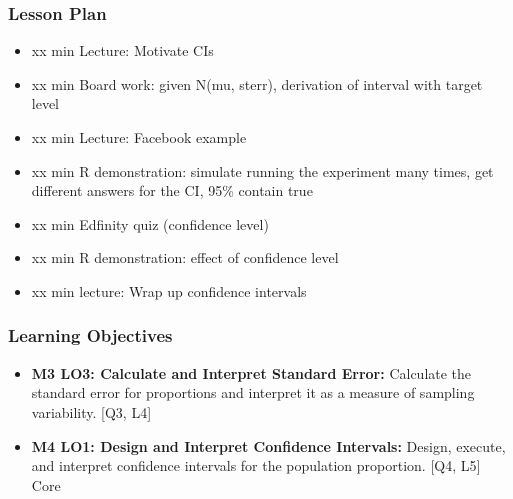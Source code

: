 

\begin{frame}
\frametitle{Lesson Plan}
\begin{itemize}
    \item xx min Lecture: Motivate CIs
    \item xx min Board work: given N(mu, sterr), derivation of interval with target level
    \item xx min Lecture: Facebook example
    \item xx min R demonstration: simulate running the experiment many times, get different answers for the CI, 95\% contain true
    \item xx min Edfinity quiz (confidence level)
    \item xx min R demonstration: effect of confidence level
    \item xx min lecture: Wrap up confidence intervals
\end{itemize}
\end{frame}
        
\begin{frame}
\frametitle{Learning Objectives}
\begin{itemize}
    \item \textbf{M3 LO3: Calculate and Interpret Standard Error:} Calculate the standard error for proportions and interpret it as a measure of sampling variability. [Q3, L4]
    \item \textbf{M4 LO1: Design and Interpret Confidence Intervals:} Design, execute, and interpret confidence intervals for the population proportion. [Q4, L5] Core 
\end{itemize}
\end{frame}


